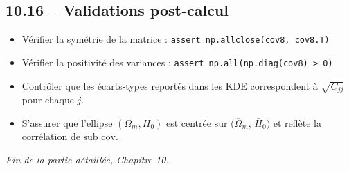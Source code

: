 \subsection{10.16 – Validations post‐calcul}
\begin{itemize}
  \item Vérifier la symétrie de la matrice :
    \verb|assert np.allclose(cov8, cov8.T)|
  \item Vérifier la positivité des variances :
    \verb|assert np.all(np.diag(cov8) > 0)|
  \item Contrôler que les écarts‐types reportés dans les KDE correspondent
        à \(\sqrt{C_{jj}}\) pour chaque \(j\).
  \item S’assurer que l’ellipse \((\Omega_{m},H_{0})\) est centrée sur
        \(\bigl(\overline{\Omega}_{m},\,\overline{H}_{0}\bigr)\)
        et reflète la corrélation de \(\text{sub_cov}\).
\end{itemize}

\bigskip
\noindent\emph{Fin de la partie détaillée, Chapitre 10.}
